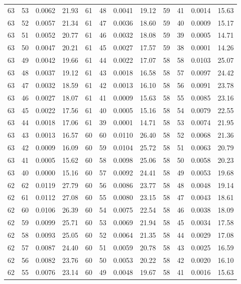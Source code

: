 \begin{tabular}{llll|llll|llll}
63 & 53 & 0.0062 & 21.93 & 61 & 48 & 0.0041 & 19.12 & 59 & 41 & 0.0014 & 15.63\\
63 & 52 & 0.0057 & 21.34 & 61 & 47 & 0.0036 & 18.60 & 59 & 40 & 0.0009 & 15.17\\
63 & 51 & 0.0052 & 20.77 & 61 & 46 & 0.0032 & 18.08 & 59 & 39 & 0.0005 & 14.71\\
63 & 50 & 0.0047 & 20.21 & 61 & 45 & 0.0027 & 17.57 & 59 & 38 & 0.0001 & 14.26\\
63 & 49 & 0.0042 & 19.66 & 61 & 44 & 0.0022 & 17.07 & 58 & 58 & 0.0103 & 25.07\\
63 & 48 & 0.0037 & 19.12 & 61 & 43 & 0.0018 & 16.58 & 58 & 57 & 0.0097 & 24.42\\
63 & 47 & 0.0032 & 18.59 & 61 & 42 & 0.0013 & 16.10 & 58 & 56 & 0.0091 & 23.78\\
63 & 46 & 0.0027 & 18.07 & 61 & 41 & 0.0009 & 15.63 & 58 & 55 & 0.0085 & 23.16\\
63 & 45 & 0.0022 & 17.56 & 61 & 40 & 0.0005 & 15.16 & 58 & 54 & 0.0079 & 22.55\\
63 & 44 & 0.0018 & 17.06 & 61 & 39 & 0.0001 & 14.71 & 58 & 53 & 0.0074 & 21.95\\
63 & 43 & 0.0013 & 16.57 & 60 & 60 & 0.0110 & 26.40 & 58 & 52 & 0.0068 & 21.36\\
63 & 42 & 0.0009 & 16.09 & 60 & 59 & 0.0104 & 25.72 & 58 & 51 & 0.0063 & 20.79\\
63 & 41 & 0.0005 & 15.62 & 60 & 58 & 0.0098 & 25.06 & 58 & 50 & 0.0058 & 20.23\\
63 & 40 & 0.0000 & 15.16 & 60 & 57 & 0.0092 & 24.41 & 58 & 49 & 0.0053 & 19.68\\
62 & 62 & 0.0119 & 27.79 & 60 & 56 & 0.0086 & 23.77 & 58 & 48 & 0.0048 & 19.14\\
62 & 61 & 0.0112 & 27.08 & 60 & 55 & 0.0080 & 23.15 & 58 & 47 & 0.0043 & 18.61\\
62 & 60 & 0.0106 & 26.39 & 60 & 54 & 0.0075 & 22.54 & 58 & 46 & 0.0038 & 18.09\\
62 & 59 & 0.0099 & 25.71 & 60 & 53 & 0.0069 & 21.94 & 58 & 45 & 0.0034 & 17.58\\
62 & 58 & 0.0093 & 25.05 & 60 & 52 & 0.0064 & 21.35 & 58 & 44 & 0.0029 & 17.08\\
62 & 57 & 0.0087 & 24.40 & 60 & 51 & 0.0059 & 20.78 & 58 & 43 & 0.0025 & 16.59\\
62 & 56 & 0.0082 & 23.76 & 60 & 50 & 0.0053 & 20.22 & 58 & 42 & 0.0020 & 16.10\\
62 & 55 & 0.0076 & 23.14 & 60 & 49 & 0.0048 & 19.67 & 58 & 41 & 0.0016 & 15.63\\

\end{tabular}

